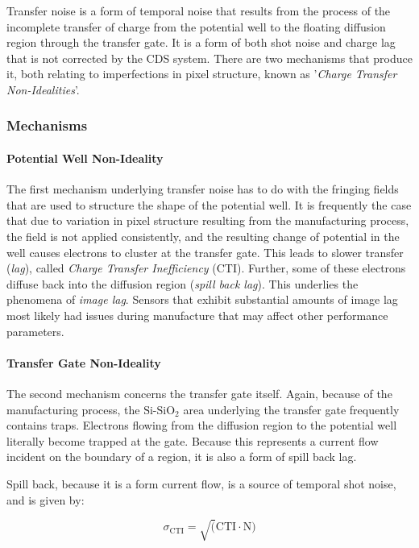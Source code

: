 \documentclass[10pt]{article}
\begin{document}
Transfer noise is a form of temporal noise that results from the process of the incomplete transfer of charge from the potential well to the floating diffusion region through the transfer gate. It is a form of both shot noise and charge lag that is not corrected by the CDS system. There are two mechanisms that produce it, both relating to imperfections in pixel structure, known as '\emph{Charge Transfer Non-Idealities}'.  

\subsubsection{Mechanisms}

\paragraph{Potential Well Non-Ideality}
The first mechanism underlying transfer noise has to do with the fringing fields that are used to structure the shape of the potential well. It is frequently the case that due to variation in pixel structure resulting from the manufacturing process, the field is not applied consistently, and the resulting change of potential in the well causes electrons to cluster at the transfer gate. This leads to slower transfer (\emph{lag}), called \emph{Charge Transfer Inefficiency} (CTI). Further, some of these electrons diffuse back into the diffusion region (\emph{spill back lag}). This underlies the phenomena of \emph{image lag}. Sensors that exhibit substantial amounts of image lag most likely had issues during manufacture that may affect other performance parameters.

\paragraph{Transfer Gate Non-Ideality}
The second mechanism concerns the transfer gate itself. Again, because of the manufacturing process, the $\text{Si-SiO}_{\text{2}} $ area underlying the transfer gate frequently contains traps. Electrons flowing from the diffusion region to the potential well literally become trapped at the gate. Because this represents a current flow incident on the boundary of a region, it is also a form of spill back lag.

Spill back, because it is a form current flow, is a source of temporal shot noise, and is given by:

$$ \sigma_{\text{CTI}}=\sqrt (\text{CTI} \cdot \text{N}) $$
\end{document}
